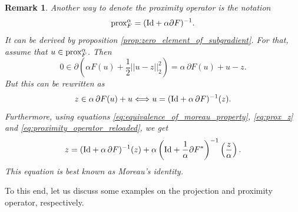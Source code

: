 \documentclass{scrreprt}
\newtheorem{remark}[theorem]{Remark}
\begin{document}
        \begin{remark}
            Another way to denote the proximity operator is the notation
                \begin{equation}
                    \textnormal{prox}^{\alpha}_{F} = (\textnormal{Id} + \alpha \partial F)^{-1}.
                    \label{eq:proximity_operator_reloaded}
                \end{equation}
            It can be derived by proposition \ref{prop:zero_element_of_subgradient}. For that, assume that $u \in \textnormal{prox}^{\alpha}_{F}$. Then
                $$
                    0 \in \partial \left( \alpha F(u) + \frac{1}{2} ||u - z||_{2}^{2} \right) = \alpha \, \partial F(u) + u - z.
                $$
            But this can be rewritten as
                $$
                    z \in \alpha\,\partial F(u) + u \Longleftrightarrow u = (\textnormal{Id} + \alpha \, \partial F)^{-1}(z).
                $$
            Furthermore, using equations \ref{eq:equivalence_of_moreau_property}, \ref{eq:prox_z} and \ref{eq:proximity_operator_reloaded}, we get
                \begin{equation}
                    z = (\textnormal{Id} + \alpha \, \partial F)^{-1}(z) + \alpha \left( \textnormal{Id} + \frac{1}{\alpha} \partial F^{\ast} \right)^{-1} \left(\frac{z}{\alpha}\right).
                    \label{eq:moreau_identity_reloaded}
                \end{equation}
            This equation is best known as Moreau's identity.
        \end{remark}

        To this end, let us discuss some examples on the projection and proximity operator, respectively.
\end{document}
